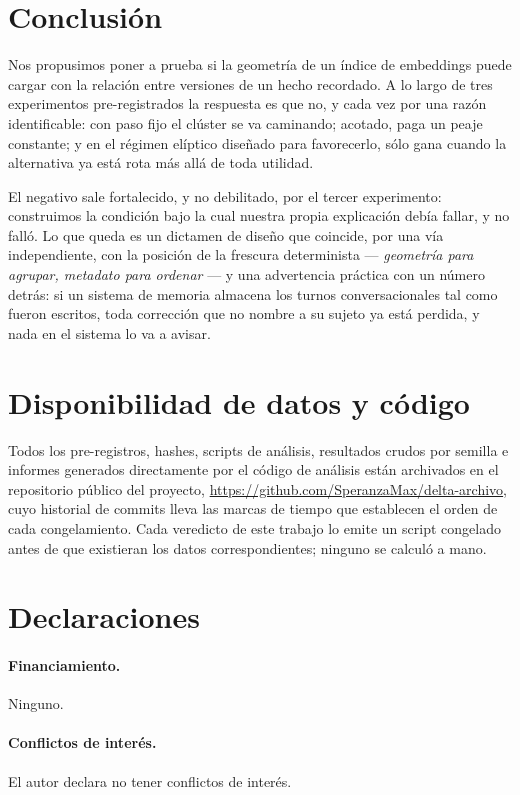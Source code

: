\documentclass[11pt,a4paper]{article}
\begin{document}
\section{Conclusión}

Nos propusimos poner a prueba si la geometría de un índice de embeddings puede cargar con la relación
entre versiones de un hecho recordado. A lo largo de tres experimentos pre-registrados la respuesta es
que no, y cada vez por una razón identificable: con paso fijo el clúster se va caminando; acotado,
paga un peaje constante; y en el régimen elíptico diseñado para favorecerlo, sólo gana cuando la
alternativa ya está rota más allá de toda utilidad.

El negativo sale fortalecido, y no debilitado, por el tercer experimento: construimos la condición
bajo la cual nuestra propia explicación debía fallar, y no falló. Lo que queda es un dictamen de
diseño que coincide, por una vía independiente, con la posición de la frescura determinista ---
\emph{geometría para agrupar, metadato para ordenar} --- y una advertencia práctica con un número
detrás: si un sistema de memoria almacena los turnos conversacionales tal como fueron escritos, toda
corrección que no nombre a su sujeto ya está perdida, y nada en el sistema lo va a avisar.

\section*{Disponibilidad de datos y código}

Todos los pre-registros, hashes, scripts de análisis, resultados crudos por semilla e informes
generados directamente por el código de análisis están archivados en el repositorio público del
proyecto, \url{https://github.com/SperanzaMax/delta-archivo}, cuyo historial de commits lleva las
marcas de tiempo que establecen el orden de cada congelamiento. Cada veredicto de este trabajo lo
emite un script congelado antes de que existieran los datos correspondientes; ninguno se calculó a
mano.

\section*{Declaraciones}

\paragraph{Financiamiento.} Ninguno.
\paragraph{Conflictos de interés.} El autor declara no tener conflictos de interés.
\end{document}
